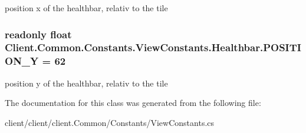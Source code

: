 position x of the healthbar, relativ to the tile 

\hypertarget{classClient_1_1Common_1_1Constants_1_1ViewConstants_1_1Healthbar_ad4bca0878f84bf09e2372de152b15354}{}
\subsubsection[{P\+O\+S\+I\+T\+I\+O\+N\+\_\+\+Y}]{\setlength{\rightskip}{0pt plus 5cm}readonly float Client.\+Common.\+Constants.\+View\+Constants.\+Healthbar.\+P\+O\+S\+I\+T\+I\+O\+N\+\_\+\+Y = 62\hspace{0.3cm}{\ttfamily [static]}}\label{classClient_1_1Common_1_1Constants_1_1ViewConstants_1_1Healthbar_ad4bca0878f84bf09e2372de152b15354}


position y of the healthbar, relativ to the tile 



The documentation for this class was generated from the following file\+:\begin{DoxyCompactItemize}
\item 
client/client/client.\+Common/\+Constants/View\+Constants.\+cs\end{DoxyCompactItemize}
